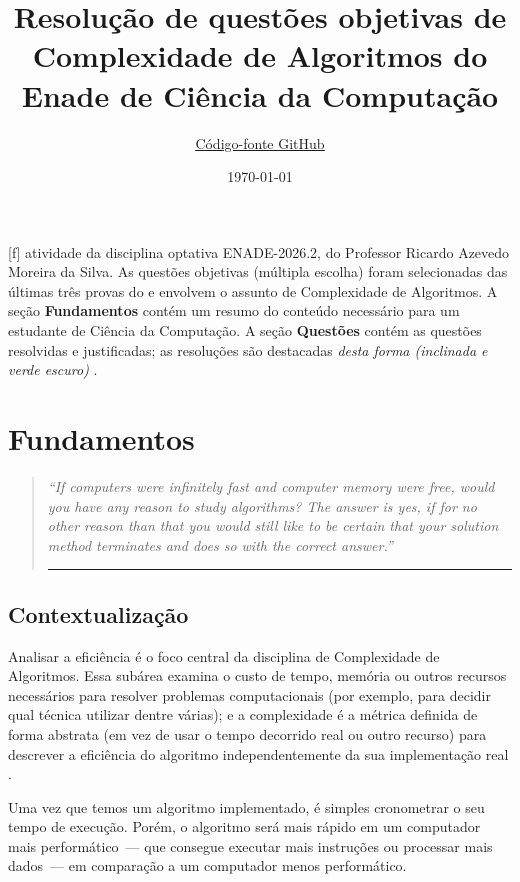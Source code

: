 \documentclass[12pt,a4paper]{article}
\title{Resolução de questões objetivas de Complexidade de Algoritmos do Enade de Ciência da Computação}
\author{\small\href{https://github.com/danielsource/enade-complexidade}{\underline{Código-fonte GitHub}}}
\date{\today}
\newenvironment{solution}{%
    \noindent
    \bgroup\textsl\bgroup\color[RGB]{20,70,40}
}{%
    \egroup\egroup
}
\begin{document}
\maketitle

[f] atividade da disciplina optativa ENADE-2026.2, do Professor Ricardo Azevedo Moreira da Silva.
As questões objetivas (múltipla escolha) foram selecionadas das últimas três provas do 
e envolvem o assunto de Complexidade de Algoritmos.
A seção \textbf{Fundamentos} contém um resumo do conteúdo necessário para um estudante de Ciência da Computação.
A seção \textbf{Questões} contém as questões resolvidas e justificadas;
as resoluções são destacadas \begin{solution}desta forma (inclinada e verde escuro)\end{solution}.

\section{Fundamentos}
\begin{quote}
    \itshape
    ``If computers were infinitely fast and computer memory were free, would you have any reason to study algorithms?
    The answer is yes, if for no other reason than that you would still like to be certain
    that your solution method terminates and does so with the correct answer.'' \parencite[12]{clrs2022}\\[-6pt]
    \rule{\linewidth}{0.3pt}
\end{quote}

\subsection{Contextualização}
Analisar a eficiência é o foco central da disciplina de Complexidade de Algoritmos.
Essa subárea examina o custo de tempo, memória ou outros recursos necessários para resolver problemas computacionais
(por exemplo, para decidir qual técnica utilizar dentre várias);
e a complexidade é a métrica definida de forma abstrata (em vez de usar o tempo decorrido real ou outro recurso)
para descrever a eficiência do algoritmo independentemente da sua implementação real
 \parencite[275--276]{sipser2012}.

Uma vez que temos um algoritmo implementado, é simples cronometrar o seu tempo de execução.
Porém, o algoritmo será mais rápido em um computador mais performático~---
que consegue executar mais instruções ou processar mais dados~---
em comparação a um computador menos performático.
\end{document}
